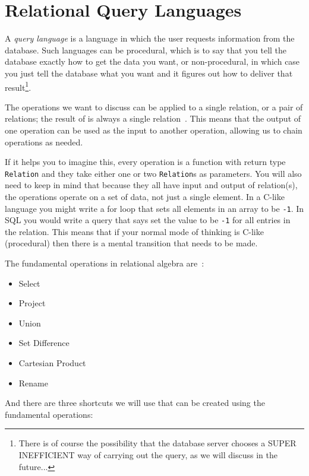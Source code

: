 




\section*{Relational Query Languages}

A \textit{query language} is a language in which the user requests information from the database. Such languages can be procedural, which is to say that you tell the database exactly how to get the data you want, or non-procedural, in which case you just tell the database what you want and it figures out how to deliver that result\footnote{There is of course the possibility that the database server chooses a SUPER INEFFICIENT way of carrying out the query, as we will discuss in the future...}.

The operations we want to discuss can be applied to a single relation, or a pair of relations; the result of is always a single relation~\cite{dsc}. This means that the output of one operation can be used as the input to another operation, allowing us to chain operations as needed. 

If it helps you to imagine this, every operation is a function with return type \texttt{Relation} and they take either one or two \texttt{Relation}s as parameters. You will also need to keep in mind that because they all have input and output of relation(s), the operations operate on a set of data, not just a single element. In a C-like language you might write a for loop that sets all elements in an array to be \texttt{-1}. In SQL you would write a query that says set the value to be \texttt{-1} for all entries in the relation. This means that if your normal mode of thinking is C-like (procedural) then there is a mental transition that needs to be made. 

The fundamental operations in relational algebra are~\cite{dsc}:
\begin{itemize}
	\item Select
	\item Project
	\item Union
	\item Set Difference
	\item Cartesian Product
	\item Rename
\end{itemize}

And there are three shortcuts we will use that can be created using the fundamental operations: 

